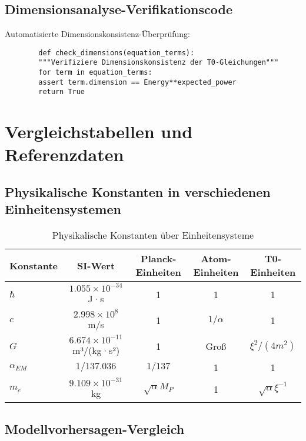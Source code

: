 \documentclass[12pt,a4paper]{article}
\begin{document}
	\subsection{Dimensionsanalyse-Verifikationscode}
	\label{app:dimensional_code}
	
	Automatisierte Dimensionskonsistenz-Überprüfung:
	\begin{verbatim}
		def check_dimensions(equation_terms):
		"""Verifiziere Dimensionskonsistenz der T0-Gleichungen"""
		for term in equation_terms:
		assert term.dimension == Energy**expected_power
		return True
	\end{verbatim}
	
	\section{Vergleichstabellen und Referenzdaten}
	\label{app:comparison_tables}
	
	\subsection{Physikalische Konstanten in verschiedenen Einheitensystemen}
	\label{app:constants_table}
	
	\begin{table}[htbp]
		\centering
		\footnotesize
		\begin{tabular}{lcccc}
			\toprule
			\textbf{Konstante} & \textbf{SI-Wert} & \textbf{Planck-Einheiten} & \textbf{Atom-Einheiten} & \textbf{T0-Einheiten} \\
			\midrule
			$\hbar$ & $1.055 \times 10^{-34}$ J·s & 1 & 1 & 1 \\
			$c$ & $2.998 \times 10^8$ m/s & 1 & $1/\alpha$ & 1 \\
			$G$ & $6.674 \times 10^{-11}$ m³/(kg·s²) & 1 & Groß & $\xi^2/(4m^2)$ \\
			$\alpha_{EM}$ & $1/137.036$ & $1/137$ & 1 & 1 \\
			$m_e$ & $9.109 \times 10^{-31}$ kg & $\sqrt{\alpha} M_P$ & 1 & $\sqrt{\alpha} \xi^{-1}$ \\
			\bottomrule
		\end{tabular}
		\caption{Physikalische Konstanten über Einheitensysteme}
		\label{tab:constants_comparison}
	\end{table}
	
	\subsection{Modellvorhersagen-Vergleich}
	\label{app:predictions_comparison}
	
\end{document}

